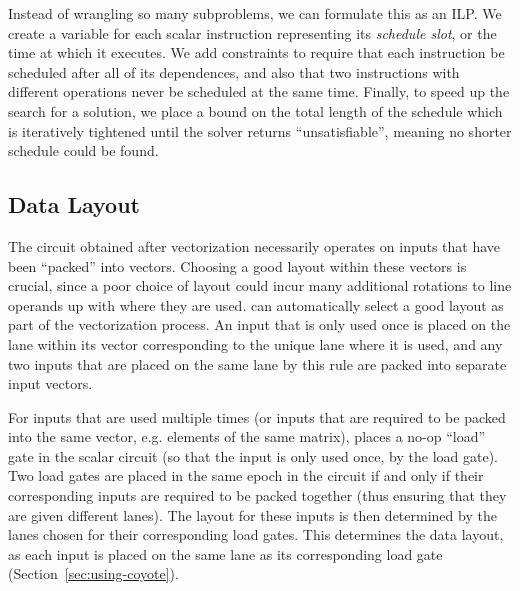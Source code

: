 Instead of wrangling so many subproblems, we can formulate this as an ILP.
We create a variable for each scalar instruction representing its {\em schedule slot}, or the time at which it executes.
We add constraints to require that each instruction be scheduled after all of its dependences, and also that two instructions with different operations never be scheduled at the same time. 
Finally, to speed up the search for a solution, we place a bound on the total length of the schedule which is iteratively tightened until the solver returns ``unsatisfiable'', meaning no shorter schedule could be found. %

\subsection{Data Layout}\label{sec:data-layout}
The circuit obtained after vectorization necessarily operates on inputs that have been ``packed'' into vectors.
Choosing a good layout within these vectors is crucial, since a poor choice of layout could incur many additional rotations to line operands up with where they are used.
\system can automatically select a good layout as part of the vectorization process.
An input that is only used once is placed on the lane within its vector corresponding to the unique lane where it is used, and any two inputs that are placed on the same lane by this rule are packed into separate input vectors.

For inputs that are used multiple times (or inputs that are required to be packed into the same vector, e.g. elements of the same matrix), \system places a no-op ``load'' gate in the scalar circuit (so that the input is only used once, by the load gate).
Two load gates are placed in the same epoch in the circuit if and only if their corresponding inputs are required to be packed together (thus ensuring that they are given different lanes).
The layout for these inputs is then determined by the lanes chosen for their corresponding load gates. 
This determines the data layout, as each input is placed on the same lane as its corresponding load gate (Section~\ref{sec:using-coyote}). %
